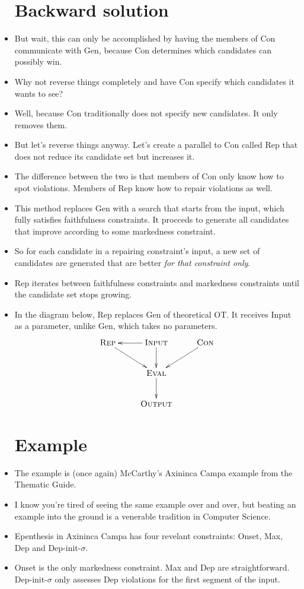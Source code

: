 \documentclass{article}[11pt]
\begin{document}
\begin{itemize}
  \section{Backward solution}
\item But wait, this can only be accomplished by having the members of {\sc Con}
  communicate with {\sc Gen}, because {\sc Con} determines which candidates can possibly
  win.
\item Why not reverse things completely and have {\sc Con} specify which candidates
  it wants to see?
\item Well, because {\sc Con} traditionally does not specify new candidates.
  It only removes them.
\item But let's reverse things anyway. Let's create a parallel to {\sc Con}
  called {\sc Rep} that does not reduce its candidate set but increases it.
\item The difference between the two is that members of {\sc Con} only know how to
  spot violations. Members of {\sc Rep} know how to repair violations as well.
\item This method replaces {\sc Gen} with a search that starts from the input, which
  fully satisfies faithfulness constraints. It procceds to generate all candidates that
  improve according to some markedness constraint.
\item So for each candidate in a repairing constraint's input, a new set of
  candidates are generated that are better {\it for that constraint only}.
\item {\sc Rep} iterates between faithfulness constraints and markedness constraints
  until the candidate set stops growing.
\item In the diagram below, {\sc Rep} replaces {\sc Gen} of theoretical OT. It receives
  {\sc Input} as a parameter, unlike {\sc Gen}, which takes no parameters.
\begin{displaymath}
    \xymatrix{ \textrm{\sc Rep} \ar[dr] & \textrm{\sc Input} \ar[l] \ar[d] & \textrm{\sc Con}\ar[dl] \\
    & \textrm{\sc Eval} \ar[d] & \\
  & \textrm{\sc Output} & }
\end{displaymath}
  \section{Example}
\item The example is (once again) McCarthy's Axininca Campa example from
  the Thematic Guide.
\item I know you're tired of seeing the same example over and over, but beating
  an example into the ground is a venerable tradition in Computer Science.
\item Epenthesis in Axininca Campa has four revelant constraints: Onset,
  Max, Dep and Dep-init-$\sigma$.
\item Onset is the only markedness constraint. Max and Dep are straightforward.
  Dep-init-$\sigma$ only assesses Dep violations for the first segment of the
  input.

\end{itemize}
\end{document}
